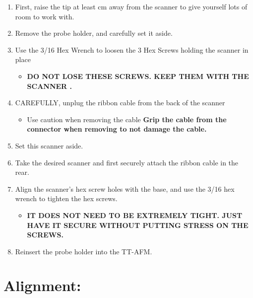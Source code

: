 \documentclass{../lab}
\begin{document}
\begin{enumerate}
    \item First, raise the tip at least cm away from the scanner to give yourself lots of room to work with.

    \item Remove the probe holder, and carefully set it aside.

    \item Use the 3/16 Hex Wrench to loosen the 3 Hex Screws holding the scanner in place

    \begin{itemize}
        \item \textbf{DO NOT LOSE THESE SCREWS. KEEP THEM WITH THE SCANNER .}

    \end{itemize}

    \item \textbf{​}CAREFULLY, unplug the ribbon cable from the back of the scanner

    \begin{itemize}
        \item Use caution when removing the cable \textbf{Grip the cable from the connector when removing to not damage the cable.}

    \end{itemize}

    \item \textbf{​}Set this scanner aside.

    \item Take the desired scanner and first securely attach the ribbon cable in the rear.

    \item Align the scanner's hex screw holes with the base, and use the 3/16 hex wrench to tighten the hex screws.

    \begin{itemize}
        \item \textbf{IT DOES NOT NEED TO BE EXTREMELY TIGHT. JUST HAVE IT SECURE WITHOUT PUTTING STRESS ON THE SCREWS.}

    \end{itemize}

    \item \textbf{​}Reinsert the probe holder into the TT-AFM.

\end{enumerate}

\section{Alignment:}
\end{document}
